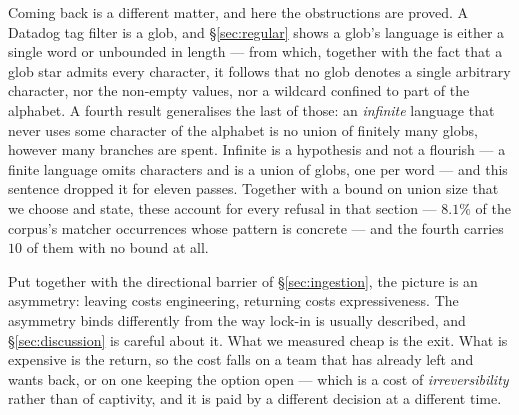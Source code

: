 Coming back is a different matter, and here the obstructions are proved. A Datadog tag
filter is a glob, and \S\ref{sec:regular} shows a glob's language is either a single word
or unbounded in length --- from which, together with the fact that a glob star admits
every character, it follows that no glob denotes a single arbitrary character, nor the
non-empty values, nor a wildcard confined to part of the alphabet. A fourth result
generalises the last of those: an \emph{infinite} language that never uses some character
of the alphabet is no union of finitely many globs, however many branches are spent.
Infinite is a hypothesis and not a flourish --- a finite language omits characters and is
a union of globs, one per word --- and this sentence dropped it for eleven passes. Together with a
bound on union size that we choose and state, these account for every refusal in that
section --- $8.1\%$ of the corpus's matcher occurrences whose pattern is concrete ---
and the fourth carries $10$ of them with no bound at all.

Put together with the directional barrier of \S\ref{sec:ingestion}, the picture is an
asymmetry: leaving costs engineering, returning costs expressiveness. The asymmetry binds
differently from the way lock-in is usually described, and \S\ref{sec:discussion} is
careful about it. What we measured cheap is the exit. What is expensive is the return, so
the cost falls on a team that has already left and wants back, or on one keeping the
option open --- which is a cost of \emph{irreversibility} rather than of captivity, and
it is paid by a different decision at a different time.

